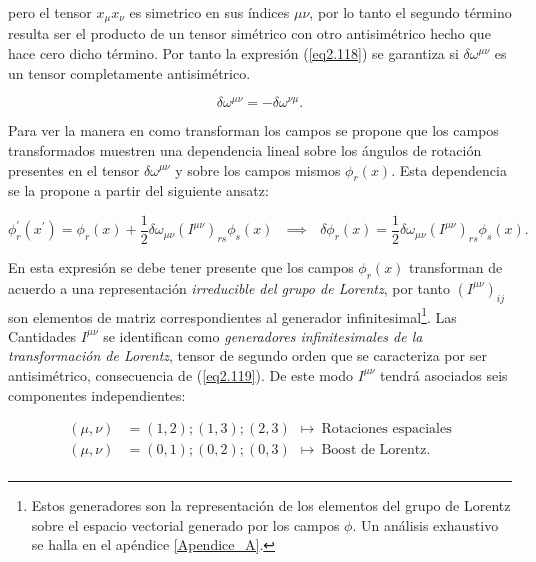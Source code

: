 pero el tensor $x_{\mu}x_{\nu}$ es simetrico en sus índices $\mu \nu$, por lo tanto el segundo término resulta ser el producto de un tensor simétrico con otro antisimétrico hecho que hace cero dicho término. Por tanto la expresión (\ref{eq2.118}) se garantiza si $\delta \omega ^{\mu \nu }$ es un tensor completamente antisimétrico. 

\begin{equation}
    \delta \omega ^{\mu \nu }=-\delta \omega ^{\nu \mu  }.
    \label{eq2.119}
\end{equation}

Para ver la manera en como transforman los campos se propone que los campos transformados muestren una dependencia lineal sobre los ángulos de rotación presentes en el tensor $\delta \omega ^ {\mu \nu}$ y sobre los campos mismos $\phi_{r}(x)$. Esta dependencia se la propone a partir del siguiente ansatz:

\begin{equation}
    \phi _{r}^{\prime }\left( x^{\prime }\right) =\phi _{r}\left( x\right) + \frac{1}{2}\delta \omega _{\mu \nu }\left( I^{\mu \nu }\right) _{rs}\phi _{s}\left( x\right) ~~~ \implies~~~ \delta \phi_{r}(x) = \frac{1}{2}\delta \omega_{\mu \nu }\left( I^{\mu \nu }\right) _{rs}\phi _{s}\left( x\right) .
    \label{eq2.120}
\end{equation}

En esta expresión se debe tener presente que los campos $\phi_{r}(x)$ transforman de acuerdo a una representación \emph{irreducible del grupo de Lorentz}, por tanto $(I^{\mu \nu})_{ij}$ son elementos de matriz correspondientes al generador infinitesimal\footnote{Estos generadores son la representación de los elementos del grupo de Lorentz sobre el espacio vectorial generado por los campos $\phi$. Un análisis exhaustivo se halla en el apéndice \ref{Apendice_A}.}. Las Cantidades $I^{\mu \nu}$ se identifican como \emph{generadores infinitesimales de la transformación de Lorentz}, tensor de segundo orden que se caracteriza por ser antisimétrico, consecuencia de (\ref{eq2.119}). De este modo $I^{\mu \nu}$ tendrá asociados seis componentes independientes:

\begin{equation}
    \begin{split}
        (\mu,\nu) &= (1,2);(1,3);(2,3)~~\longmapsto ~\text{Rotaciones espaciales}\\
        (\mu,\nu) &= (0,1);(0,2);(0,3)~~\longmapsto ~\text{Boost de Lorentz}.\\
    \end{split}
\end{equation}

